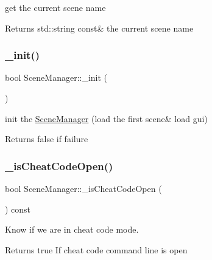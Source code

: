 get the current scene name 

\begin{DoxyReturn}{Returns}
std\+::string const\& the current scene name 
\end{DoxyReturn}
\mbox{\label{class_scene_manager_a3dd5f5c63c893508ddb701d19533a0c6}} 
\subsubsection{\texorpdfstring{\+\_\+init()}{\_init()}}
{\footnotesize\ttfamily bool Scene\+Manager\+::\+\_\+init (\begin{DoxyParamCaption}{ }\end{DoxyParamCaption})\hspace{0.3cm}{\ttfamily [protected]}}



init the \hyperlink{class_scene_manager}{Scene\+Manager} (load the first scene\& load gui) 

\begin{DoxyReturn}{Returns}
false if failure 
\end{DoxyReturn}
\mbox{\label{class_scene_manager_a2623c67be48d3a903c1638ff291674a9}} 
\subsubsection{\texorpdfstring{\+\_\+is\+Cheat\+Code\+Open()}{\_isCheatCodeOpen()}}
{\footnotesize\ttfamily bool Scene\+Manager\+::\+\_\+is\+Cheat\+Code\+Open (\begin{DoxyParamCaption}{ }\end{DoxyParamCaption}) const\hspace{0.3cm}{\ttfamily [protected]}}



Know if we are in cheat code mode. 

\begin{DoxyReturn}{Returns}
true If cheat code command line is open 
\end{DoxyReturn}
\mbox{\label{class_scene_manager_a1bcdec59b83d98bce12e8e98649f19c9}} 
